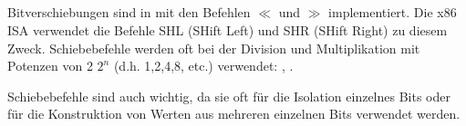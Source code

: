 \subsection{\ShiftsSectionName}
Bitverschiebungen sind in \CCpp mit den Befehlen $\ll$ und $\gg$ implementiert.
Die x86 \ac{ISA} verwendet die Befehle SHL (SHift Left) und SHR (SHift Right) zu
diesem Zweck.
Schiebebefehle werden oft bei der Division und Multiplikation mit Potenzen von 2
$2^n$ (d.h. 1,2,4,8, etc.) verwendet:
,
.

Schiebebefehle sind auch wichtig, da sie oft für die Isolation einzelnes Bits
oder für die Konstruktion von Werten aus mehreren einzelnen Bits verwendet
werden.
